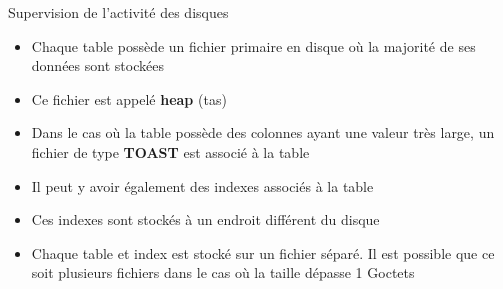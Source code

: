 %
%
%
%
%

\begin{frame}{Supervision de l'activité des disques}

\begin{itemize}

   \item Chaque table possède un fichier primaire en disque où la majorité de ses données sont stockées
   \item Ce fichier est appelé \textbf{heap} (tas)
   \item Dans le cas où la table possède des colonnes ayant une valeur très large, un fichier de type \textbf{TOAST} est associé à la table
   \item Il peut y avoir également des indexes associés à la table
   \item Ces indexes sont stockés à un endroit différent du disque
   \item Chaque table et index est stocké sur un fichier séparé. Il est possible que ce soit plusieurs fichiers dans le cas où la taille dépasse 1 Goctets

\end{itemize}

\begin{toile}
\end{toile}

\end{frame}


